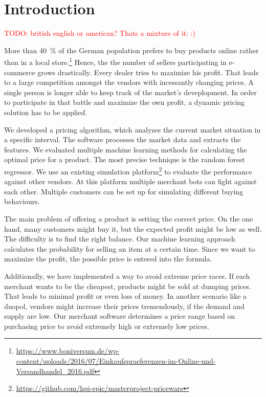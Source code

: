 \section{Introduction}

\textcolor{red}{TODO: british english or american? Thats a mixture of it: :)}

\noindent More than 40~\% of the German population prefers to buy products online rather than in a local store.\footnote{\href{https://www.boniversum.de/wp-content/uploads/2016/07/Einkaufspraeferenzen-im-Online-und-Versandhandel\_2016.pdf}{https://www.boniversum.de/wp-content/uploads/2016/07/Einkaufspraeferenzen-im-Online-und-Versandhandel\_2016.pdf}} Hence, the the number of sellers participating in e-commerce grows drastically. Every dealer tries to maximize his profit. That leads to a large competition amongst the vendors with incessantly changing prices. A single person is longer able to keep track of the market's deveplopment. In order to participate in that battle and maximize the own profit, a dynamic pricing solution has to be applied.

We developed a pricing algorithm, which analyzes the current market situation in a specific interval. The software processes the market data and extracts the features. We evaluated multiple machine learning methods for calculating the optimal price for a product. The most precise technique is the random forest regressor. We use an existing simulation platform\footnote{\href{https://github.com/hpi-epic/masterproject-pricewars}{https://github.com/hpi-epic/masterproject-pricewars}} to evaluate the performance against other vendors. At this platform multiple merchant bots can fight against each other. Multiple customers can be set up for simulating different buying behaviours.

The main problem of offering a product is setting the correct price. On the one hand, many customers might buy it, but the expected profit might be low as well. The difficulty is to find the right balance. Our machine learning approach calculates the probability for selling an item at a certain time. Since we want to maximize the profit, the possible price is entered into the formula.

Additionally, we have implemented a way to avoid extreme price races. If each merchant wants to be the cheapest, products might be sold at dumping prices. That leads to minimal profit or even loss of money. In another scenario like a duopol, vendors might increase their prices tremendously, if the demand and supply are low. Our merchant software determines a price range based on purchasing price to avoid extremely high or extremely low prices.

